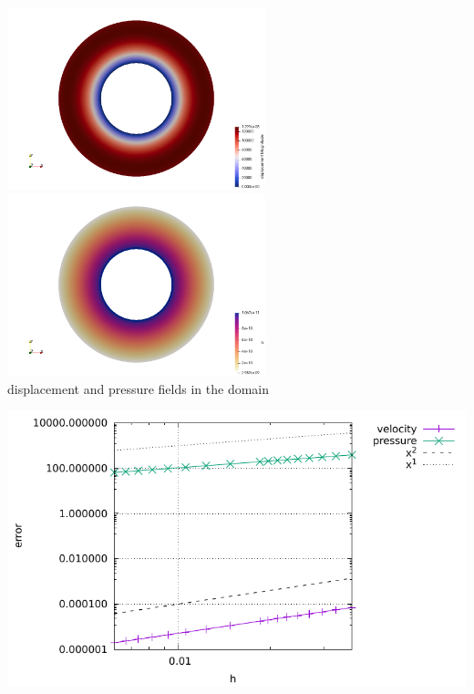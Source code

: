 \begin{center}
\includegraphics[width=7.5cm]{python_codes/fieldstone_36/results/disp}
\includegraphics[width=7.5cm]{python_codes/fieldstone_36/results/p}\\
{\small displacement and pressure fields in the domain}
\end{center}

\begin{center}
\includegraphics[width=16cm]{python_codes/fieldstone_36/results/errors}
\end{center}

